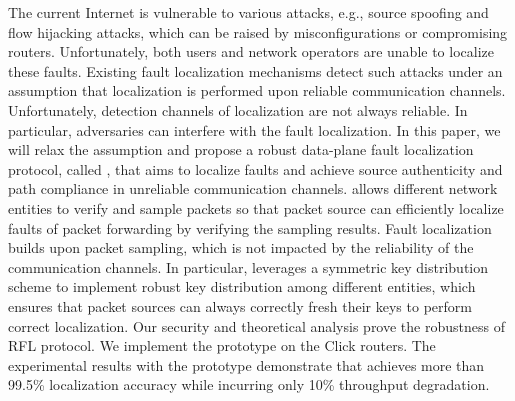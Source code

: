 The current Internet is vulnerable to various attacks, e.g., source spoofing and flow hijacking attacks, which can be raised by misconfigurations or compromising routers. Unfortunately, both users and network operators are unable to localize these faults. Existing fault localization mechanisms detect such attacks under an assumption that localization is performed upon reliable communication channels. Unfortunately, detection channels of localization are not always reliable. In particular, adversaries can interfere with the fault localization. In this paper, we will relax the assumption and propose a robust data-plane fault localization protocol, called \name{},  
that aims to localize faults and achieve source authenticity and path compliance in unreliable communication channels. \name{} allows different network entities to verify and sample packets so that packet source can efficiently localize faults of packet forwarding by verifying the sampling results. %
Fault localization builds upon packet sampling, which is not impacted by the reliability of the communication channels. 
In particular, \name{} leverages a symmetric key distribution scheme to implement robust key distribution among different entities, which ensures that packet sources can always correctly fresh their keys to perform correct localization. 
Our security and theoretical analysis prove the robustness of RFL protocol. We implement the \name{} prototype on the Click routers. The experimental results with the prototype demonstrate that \name{} achieves more than 99.5\% localization accuracy while incurring only 10\% throughput degradation.

